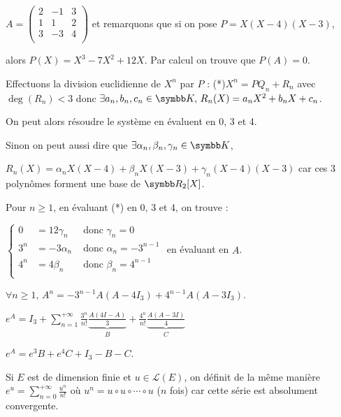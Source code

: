 \begin{exemple}
    $A = \begin{pmatrix}
        2 & -1 & 3\\
        1 & 1 & 2 \\
        3 & -3 & 4 \\
    \end{pmatrix}$ et remarquons que si on pose $P = X(X - 4)(X - 3)$, 
    
    alors $P(X) = X^3 - 7 X^2 + 12X$. Par calcul on trouve que $P(A) = 0$.

    Effectuons la division euclidienne de $X^n$ par $P$ : (*)$X^n = P Q_n + R_n$ avec 
    $\deg(R_n) < 3$ donc $\exists a_n, b_n, c_n \in \K, \, R_n(X) = a_n X^2 + b_n X + c_n$.

    On peut alors résoudre le système en évaluent en 0, 3 et 4. 

    Sinon on peut aussi dire que $\exists \alpha_n, \beta_n, \gamma_n \in \K$,  
    
    $R_n(X) = \alpha_n X(X - 4) + \beta_n X(X - 3) + \gamma_n (X - 4)(X - 3)$
    car ces 3 polynômes forment une base de $\R_2[X]$.

    Pour $n \geqslant 1$, en évaluant (*) en 0, 3 et 4, on trouve : 

    $\left\{ \begin{array}{rcl}
        0 & = 12 \gamma_n & \text{ donc } \gamma_n = 0\\
        3^n & = -3 \alpha_n & \text{ donc } \alpha_n = - 3^{n - 1} \\
        4^n & = 4 \beta_n & \text{ donc } \beta_n = 4^{n - 1}\\
    \end{array} \right.
    $ en évaluant en $A$. 

    $\forall n \geqslant 1, \, A^n = -3^{n - 1} A(A - 4 I_3) + 4^{n - 1} A(A - 3 I_3)$.

    $\displaystyle e^A = I_3 + \sum_{n = 1}^{+\infty} \frac{3^n}{n!} \underbrace{\frac{A(4I - A)}{3}}_B + \frac{4^n}{n!} \underbrace{\frac{A(A - 3 I)}{4}}_C$

    $e^A = e^3 B + e^4 C + I_3 - B - C$.
\end{exemple}

\begin{remarque}
    Si $E$ est de dimension finie et $u \in \mathscr{L }(E)$, on définit de la même manière 
    $\displaystyle e^u = \sum_{n = 0}^{+\infty} \frac{u^n}{n!}$ où $u^n = u \circ u \circ \cdots \circ u$ ($n$ fois)
    car cette série est absolument convergente. 
\end{remarque}

